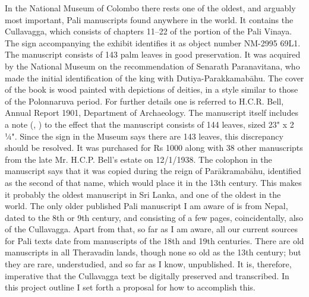 \markdownRendererInterblockSeparator
{}In the National Museum of Colombo there rests one of the oldest, and arguably most important, Pali manuscripts found anywhere in the world. It contains the Cullavagga, which consists of chapters 11–22 of the  portion of the Pali Vinaya.\markdownRendererInterblockSeparator
{}\markdownRendererInterblockSeparator
{}The sign accompanying the exhibit identifies it as object number NM-2995 69L1. The manuscript consists of 143 palm leaves in good preservation. It was acquired by the National Museum on the recommendation of Senarath Paranavitana, who made the initial identification of the king with Dutiya-Parakkamabāhu. The cover of the book is wood painted with depictions of deities, in a style similar to those of the Polonnaruva period. For further details one is referred to H.C.R. Bell, Annual Report 1901, Department of Archaeology.\markdownRendererInterblockSeparator
{}The manuscript itself includes a note (, ) to the effect that the manuscript consists of 144 leaves, sized 23" x 2 ¼". Since the sign in the Museum says there are 143 leaves, this discrepancy should be resolved. It was purchased for Rs 1000 along with 38 other manuscripts from the late Mr. H.C.P. Bell’s estate on 12/1/1938.\markdownRendererInterblockSeparator
{}The colophon in the manuscript says that it was copied during the reign of Parākramabāhu, identified as the second of that name, which would place it in the 13th century. This makes it probably the oldest manuscript in Sri Lanka, and one of the oldest in the world. The only older published Pali manuscript I am aware of is from Nepal, dated to the 8th or 9th century, and consisting of a few pages, coincidentally, also of the Cullavagga. Apart from that, so far as I am aware, all our current sources for Pali texts date from manuscripts of the 18th and 19th centuries. There are old manuscripts in all Theravadin lands, though none so old as the 13th century; but they are rare, understudied, and so far as I know, unpublished. It is, therefore, imperative that the Cullavagga text be digitally preserved and transcribed. In this project outline I set forth a proposal for how to accomplish this.\markdownRendererInterblockSeparator
